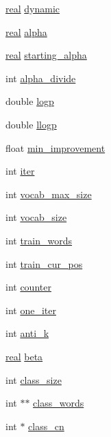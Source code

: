 \begin{DoxyCompactItemize}
\hyperlink{rnnlmlib_8h_a11d147c64891830c9e79b3315b1b2e21}{real} \hyperlink{class_c_rnn_l_m_a8e09fd160a93a272b7df6d91f42fd10b}{dynamic}
\item 
\hyperlink{rnnlmlib_8h_a11d147c64891830c9e79b3315b1b2e21}{real} \hyperlink{class_c_rnn_l_m_a19ebbf1899815293ad581d592c1581b8}{alpha}
\item 
\hyperlink{rnnlmlib_8h_a11d147c64891830c9e79b3315b1b2e21}{real} \hyperlink{class_c_rnn_l_m_aa3456f305cc32b366c90c226537d3da7}{starting\+\_\+alpha}
\item 
int \hyperlink{class_c_rnn_l_m_a0ca88edb6f5ec877f64de0419dd24b9e}{alpha\+\_\+divide}
\item 
double \hyperlink{class_c_rnn_l_m_a237fcd191d5e9be4590275fe472604a0}{logp}
\item 
double \hyperlink{class_c_rnn_l_m_addb6080ed0f377e9bfef0ad0f526370d}{llogp}
\item 
float \hyperlink{class_c_rnn_l_m_a7bad24d315b28a53550944cd3e64b953}{min\+\_\+improvement}
\item 
int \hyperlink{class_c_rnn_l_m_aff9e429b5225950afc0ead875877b62c}{iter}
\item 
int \hyperlink{class_c_rnn_l_m_ac3c72a904bf84af933c1889aeea7e522}{vocab\+\_\+max\+\_\+size}
\item 
int \hyperlink{class_c_rnn_l_m_a4c8ca419abe51c526d07a7a939271511}{vocab\+\_\+size}
\item 
int \hyperlink{class_c_rnn_l_m_a4b3fd57d17fa5a40d156d6db95160720}{train\+\_\+words}
\item 
int \hyperlink{class_c_rnn_l_m_a76b940a6c3a3b518f68ef9cfea7a4073}{train\+\_\+cur\+\_\+pos}
\item 
int \hyperlink{class_c_rnn_l_m_a2f18857713431c0a60dbeda23672c7f4}{counter}
\item 
int \hyperlink{class_c_rnn_l_m_af26096811bec7505c022a33bfb0b8fce}{one\+\_\+iter}
\item 
int \hyperlink{class_c_rnn_l_m_a07d6ea448c2b487d047462854fcea546}{anti\+\_\+k}
\item 
\hyperlink{rnnlmlib_8h_a11d147c64891830c9e79b3315b1b2e21}{real} \hyperlink{class_c_rnn_l_m_aebb7e9ff5027c5f401c6325d99b42113}{beta}
\item 
int \hyperlink{class_c_rnn_l_m_abd8da34b8e1902b870af1ca93aeb8df3}{class\+\_\+size}
\item 
int $\ast$$\ast$ \hyperlink{class_c_rnn_l_m_ac9da16a05a6c9cb8990b0746f745a939}{class\+\_\+words}
\item 
int $\ast$ \hyperlink{class_c_rnn_l_m_a358b824d1042d746c75606058fc4b785}{class\+\_\+cn}
$$
\end{DoxyCompactItemize}
